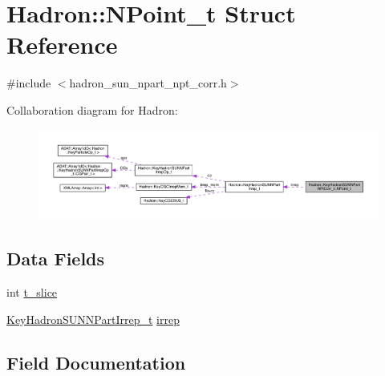 \hypertarget{structHadron_1_1KeyHadronSUNNPartNPtCorr__t_1_1NPoint__t}{}\section{Hadron\+:\+:N\+Point\+\_\+t Struct Reference}
\label{structHadron_1_1KeyHadronSUNNPartNPtCorr__t_1_1NPoint__t}


{\ttfamily \#include $<$hadron\+\_\+sun\+\_\+npart\+\_\+npt\+\_\+corr.\+h$>$}



Collaboration diagram for Hadron\+:\nopagebreak
\begin{figure}[H]
\begin{center}
\leavevmode
\includegraphics[width=350pt]{db/d2b/structHadron_1_1KeyHadronSUNNPartNPtCorr__t_1_1NPoint__t__coll__graph}
\end{center}
\end{figure}
\subsection*{Data Fields}
\begin{DoxyCompactItemize}
\item 
int \mbox{\hyperlink{structHadron_1_1KeyHadronSUNNPartNPtCorr__t_1_1NPoint__t_a4c2126c62685080f6e33544a9ba60488}{t\+\_\+slice}}
\item 
\mbox{\hyperlink{structHadron_1_1KeyHadronSUNNPartIrrep__t}{Key\+Hadron\+S\+U\+N\+N\+Part\+Irrep\+\_\+t}} \mbox{\hyperlink{structHadron_1_1KeyHadronSUNNPartNPtCorr__t_1_1NPoint__t_a9b639be4a70afdaa9da8a4430ab8957d}{irrep}}
\end{DoxyCompactItemize}


\subsection{Field Documentation}
\mbox{\label{structHadron_1_1KeyHadronSUNNPartNPtCorr__t_1_1NPoint__t_a9b639be4a70afdaa9da8a4430ab8957d}} 
